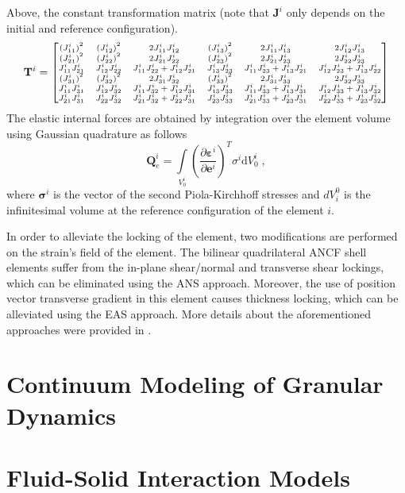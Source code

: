  Above, the constant transformation matrix (note that ${{\mathbf{J}}^{i}}$ only depends on the initial and reference configuration).
\begin{equation} \label{eq:equ10}\scriptsize
{{\mathbf{T}}^{i}}=\left[ \begin{matrix}
{{(J_{11}^{i})}^{2}} & {{(J_{12}^{i})}^{2}} & 2J_{11}^{i}J_{12}^{i} & {{(J_{13}^{i})}^{2}} & 2J_{11}^{i}J_{13}^{i} & 2J_{12}^{i}J_{13}^{i}  \\
{{(J_{21}^{i})}^{2}} & {{(J_{22}^{i})}^{2}} & 2J_{21}^{i}J_{22}^{i} & {{(J_{23}^{i})}^{2}} & 2J_{21}^{i}J_{23}^{i} & 2J_{22}^{i}J_{23}^{i}  \\
J_{11}^{i}J_{21}^{i} & J_{12}^{i}J_{22}^{i} & J_{11}^{i}J_{22}^{i}+J_{12}^{i}J_{21}^{i} & J_{13}^{i}J_{23}^{i} & J_{11}^{i}J_{23}^{i}+J_{13}^{i}J_{21}^{i} & J_{12}^{i}J_{23}^{i}+J_{13}^{i}J_{22}^{i}  \\
{{(J_{31}^{i})}^{2}} & {{(J_{32}^{i})}^{2}} & 2J_{31}^{i}J_{32}^{i} & {{(J_{33}^{i})}^{2}} & 2J_{31}^{i}J_{33}^{i} & 2J_{32}^{i}J_{33}^{i}  \\
J_{11}^{i}J_{31}^{i} & J_{12}^{i}J_{32}^{i} & J_{11}^{i}J_{32}^{i}+J_{12}^{i}J_{31}^{i} & J_{13}^{i}J_{33}^{i} & J_{11}^{i}J_{33}^{i}+J_{13}^{i}J_{31}^{i} & J_{12}^{i}J_{33}^{i}+J_{13}^{i}J_{32}^{i}  \\
J_{21}^{i}J_{31}^{i} & J_{22}^{i}J_{32}^{i} & J_{21}^{i}J_{32}^{i}+J_{22}^{i}J_{31}^{i} & J_{23}^{i}J_{33}^{i} & J_{21}^{i}J_{33}^{i}+J_{23}^{i}J_{31}^{i} & J_{22}^{i}J_{33}^{i}+J_{23}^{i}J_{32}^{i}  \\
\end{matrix} \right]\normalsize
\end{equation}
The elastic internal forces are obtained by integration over the element volume using Gaussian quadrature as follows
\begin{equation} \label{eq:equ11}
\mathbf{Q}_{e}^{i}=\int\limits_{V_0^i}{\left( \frac{\partial {{\mathbf{\varepsilon }}^{i}}}{\partial {{\mathbf{e}}^{i}}} \right)^T} \sigma ^i \text{d}{{V}_{0}^i}\;,
\end{equation}
where $\mathbf{\sigma}^{i}$ is the vector of the second Piola-Kirchhoff stresses and $dV_i^0$ is the infinitesimal volume at the reference configuration of the element $i$.  

In order to alleviate the locking of the element, two modifications are performed on the strain's field of the element. The bilinear quadrilateral ANCF shell elements suffer from the in-plane shear/normal and transverse shear lockings, which can be eliminated using the ANS approach. Moreover, the use of position vector transverse gradient in this element causes thickness locking, which can be alleviated using the EAS approach. More details about  the aforementioned approaches were provided in \cite{Yamashita2015continuum}.

\section{Continuum Modeling of Granular Dynamics}


\section{Fluid-Solid Interaction Models}